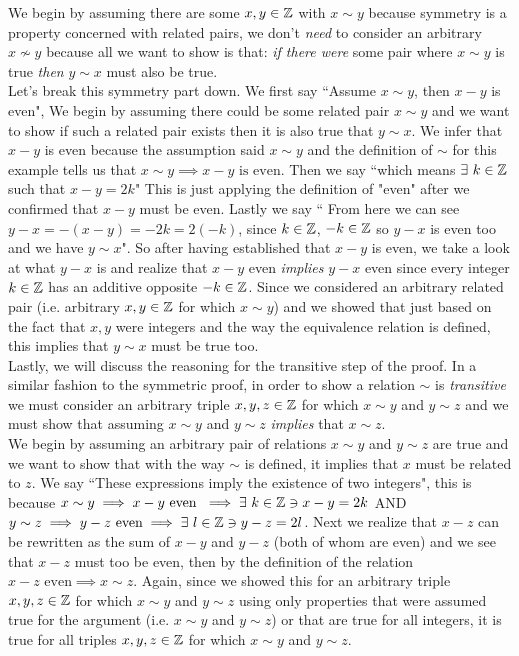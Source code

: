 We begin by assuming there are some $x,y\in {\mathbb{ Z}}$ with $x\sim y$ because symmetry is a property concerned with related pairs, we don't \textit{need} to consider an arbitrary $x\not\sim y$ because all we want to show is that: \textit{if there were} some pair where $x\sim y$ is true \textit{then} $y\sim x$ must also be true. \steezybreak\\
Let's break this symmetry part down. We first say ``Assume $x\sim y$, then $x-y$ is even", We begin by assuming there could be some related pair $x\sim y$ and we want to show if such a related pair exists then it is also true that $y\sim x$. We infer that $x-y$ is even because the assumption said $x\sim y$ and the definition of $\sim$ for this example tells us that $x\sim y \implies x-y \text{ is even}$. Then we say ``which means $\exists \ k\in {\mathbb{ Z}}$ such that $x-y=2k$" This is just applying the definition of "even" after we confirmed that $x-y$ must be even. Lastly we say `` From here we can see $y-x=-(x-y)=-2k=2(-k)$, since $k\in {\mathbb{ Z}}$, $-k\in {\mathbb{ Z}}$ so $y-x$ is even too and we have $y\sim x$". So after having established that $x-y$ is even, we take a look at what $y-x$ is and realize that $x-y$ even \textit{implies} $y-x$ even since every integer $k\in {\mathbb{ Z}}$ has an additive opposite $-k\in {\mathbb{ Z}}$. Since we considered an arbitrary related pair (i.e. arbitrary $x,y\in {\mathbb{ Z}}$ for which $x\sim y$) and we showed that just based on the fact that $x,y$ were integers and the way the equivalence relation is defined, this implies that $y\sim x$ must be true too.\steezybreak\\
Lastly, we will discuss the reasoning for the transitive step of the proof. In a similar fashion to the symmetric proof, in order to show a relation $\sim$ is \textit{transitive} we must consider an arbitrary triple $x,y,z \in {\mathbb{ Z}}$ for which $x\sim y$ and $y\sim z$ and we must show that assuming $x\sim y$ and $y\sim z$ \textit{implies} that $x\sim z$.\steezybreak\\
We begin by assuming an arbitrary pair of relations $x\sim y$ and $y\sim z$ are true and we want to show that with the way $\sim$ is defined, it implies that $x$ must be related to $z$. We say ``These expressions imply the existence of two integers", this is because $x\sim y\implies x-y \text{ even }\implies \exists \ k\in {\mathbb{ Z}} \ni x-y=2k$ AND $y\sim z\implies y-z \text{ even}\implies \exists \ l\in \Z \ni y-z=2l$. Next we realize that $x-z$ can be rewritten as the sum of $x-y$ and $y-z$ (both of whom are even) and we see that $x-z$ must too be even, then by the definition of the relation $x-z \text{ even}\implies x\sim z$. Again, since we showed this for an arbitrary triple $x,y,z\in {\mathbb{ Z}}$ for which $x\sim y$ and $y\sim z$ using only properties that were assumed true for the argument (i.e. $x\sim y$ and $y\sim z$) or that are true for all integers, it is true for all triples $x,y,z\in {\mathbb{ Z}}$ for which $x\sim y$ and $y\sim z$.

